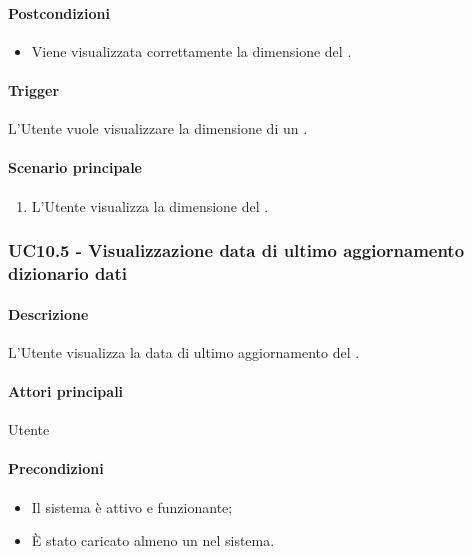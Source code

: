 \paragraph*{Postcondizioni}
\begin{itemize}
  \item Viene visualizzata correttamente la dimensione del .
\end{itemize}

\paragraph*{Trigger}
L'Utente vuole visualizzare la dimensione di un .

\paragraph*{Scenario principale}
\begin{enumerate}
  \item L'Utente visualizza la dimensione del .
\end{enumerate}


\subsubsection{UC10.5 - Visualizzazione data di ultimo aggiornamento dizionario dati}\label{UC10point5}
\paragraph*{Descrizione}
L'Utente visualizza la data di ultimo aggiornamento del .

\paragraph*{Attori principali}
Utente

\paragraph*{Precondizioni}
\begin{itemize}
  \item Il sistema è attivo e funzionante;
  \item È stato caricato almeno un  nel sistema. 
\end{itemize}

